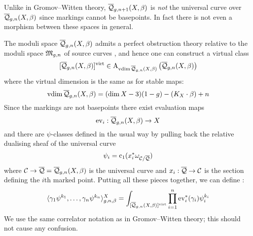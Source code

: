 
\begin{remark} Unlike in Gromov--Witten theory, $\overline{\mathcal Q}_{g,n+1}(X,\beta)$ is \emph{not} the universal curve over $\overline{\mathcal Q}_{g,n}(X,\beta)$ since markings cannot be basepoints. In fact there is not even a morphism between these spaces in general.\end{remark}

The moduli space $\overline{\mathcal Q}_{g,n}(X,\beta)$ admits a perfect obstruction theory relative to the moduli space $\mathfrak M_{g,n}$ of source curves \cite[\S 5]{CF-K}, and hence one can construct a virtual class
\begin{equation*} [\overline{\mathcal Q}_{g,n}(X,\beta)]^{\operatorname{virt}} \in \operatorname{A}_{\operatorname{vdim}\overline{\mathcal Q}_{g,n}(X,\beta)} \left( \overline{\mathcal Q}_{g,n}(X,\beta) \right) \end{equation*}
where the virtual dimension is the same as for stable maps:
\begin{equation*} \operatorname{vdim}\overline{\mathcal Q}_{g,n}(X,\beta) = (\dim{X} - 3)(1-g) - (K_X \cdot \beta) + n \end{equation*}
Since the markings are not basepoints there exist evaluation maps
\begin{equation*} \operatorname{ev}_i : \overline{\mathcal Q}_{g,n}(X,\beta) \rightarrow X \end{equation*}
and there are $\psi$-classes defined in the usual way by pulling back the relative dualising sheaf of the universal curve
\begin{equation*} \psi_i = \operatorname{c}_1(x_i^* \omega_{\mathcal{C}/\overline{\mathcal{Q}}}) \end{equation*}
where $\mathcal{C} \rightarrow \overline{\mathcal{Q}} = \overline{\mathcal Q}_{g,n}(X,\beta)$ is the universal curve and $x_i : \overline{\mathcal{Q}} \rightarrow \mathcal{C}$ is the section defining the $i$th marked point. Putting all these pieces together, we can define :
\begin{equation*} \langle \gamma_1 \psi^{k_1} , \ldots, \gamma_n \psi^{k_n} \rangle_{g,n,\beta}^X = \int_{[\overline{\mathcal Q}_{g,n}(X,\beta)]^{\operatorname{virt}}} \prod_{i=1}^n \operatorname{ev}_i^* (\gamma_i) \psi_i^{k_i} \end{equation*}
We use the same correlator notation as in Gromov--Witten theory; this should not cause any confusion.

